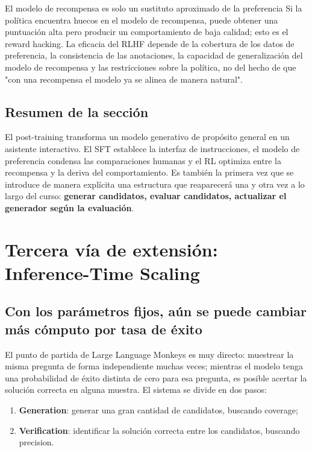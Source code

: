 \documentclass[a4paper]{article}
\begin{document}
\begin{warningbox}{El modelo de recompensa es solo un sustituto aproximado de la preferencia}
Si la política encuentra huecos en el modelo de recompensa, puede obtener una puntuación alta pero producir un comportamiento de baja calidad; esto es el reward hacking. La eficacia del RLHF depende de la cobertura de los datos de preferencia, la consistencia de las anotaciones, la capacidad de generalización del modelo de recompensa y las restricciones sobre la política, no del hecho de que "con una recompensa el modelo ya se alinea de manera natural".
\end{warningbox}

\subsection{Resumen de la sección}

El post-training transforma un modelo generativo de propósito general en un asistente interactivo. El SFT establece la interfaz de instrucciones, el modelo de preferencia condensa las comparaciones humanas y el RL optimiza entre la recompensa y la deriva del comportamiento. Es también la primera vez que se introduce de manera explícita una estructura que reaparecerá una y otra vez a lo largo del curso: \textbf{generar candidatos, evaluar candidatos, actualizar el generador según la evaluación}.

\section{Tercera vía de extensión: Inference-Time Scaling}

\subsection{Con los parámetros fijos, aún se puede cambiar más cómputo por tasa de éxito}

El punto de partida de Large Language Monkeys es muy directo: muestrear la misma pregunta de forma independiente muchas veces; mientras el modelo tenga una probabilidad de éxito distinta de cero para esa pregunta, es posible acertar la solución correcta en alguna muestra. El sistema se divide en dos pasos:

\begin{enumerate}
    \item \textbf{Generation}: generar una gran cantidad de candidatos, buscando coverage;
    \item \textbf{Verification}: identificar la solución correcta entre los candidatos, buscando precision.
\end{enumerate}
\end{document}
